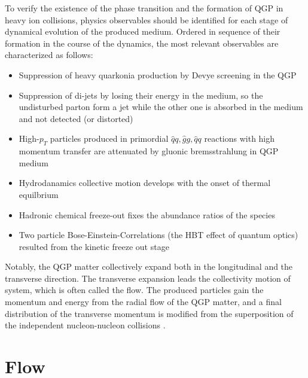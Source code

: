 	To verify the existence of the phase transition and the formation of QGP in heavy ion collisions, physics observables should be identified for each stage of dynamical evolution of the produced medium. Ordered in sequence of their formation in the course of the dynamics, the most relevant observables are characterized as follows:
	
	\begin{itemize}
		\item Suppression of heavy quarkonia production by Devye screening in the QGP
		\item Suppression of di-jets by losing their energy in the medium, so the undisturbed parton form a jet while the other one is absorbed in the medium and not detected (or distorted)
		\item High-$p_T$ particles produced in primordial $\hat{q}q, \hat{g}g, \hat{q}q$ reactions with high momentum transfer are attenuated by gluonic bremsstrahlung in QGP medium
		\item Hydrodanamics collective motion develops with the onset of thermal equilbrium
		\item Hadronic chemical freeze-out fixes the abundance ratios of the species
		\item Two particle Bose-Einstein-Correlations (the HBT effect of quantum optics) resulted from the kinetic freeze out stage
	\end{itemize}


 	Notably, the QGP matter collectively expand both in the longitudinal and the transverse direction. The transverse expansion leads the collectivity motion of system, which is often called the flow. The produced particles gain the momentum and energy from the radial flow of the QGP matter, and a final distribution of the transverse momentum is modified from the superposition of the independent nucleon-nucleon collisions \cite{Shen:2011eg}.
 	


\section{Flow}
\label{sec:flow}
